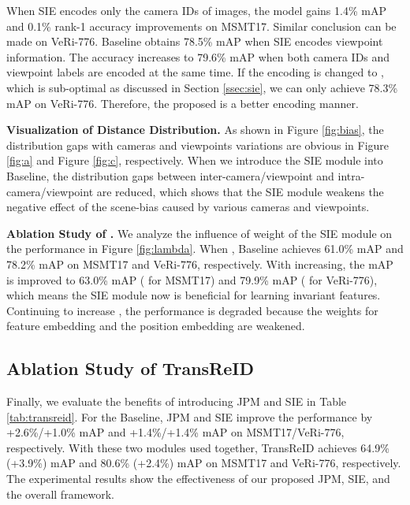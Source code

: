\documentclass[10pt,twocolumn,letterpaper]{article}
\begin{document}
When SIE encodes only the camera IDs of images, the model gains 1.4\% mAP and 0.1\% rank-1 accuracy improvements on MSMT17. Similar conclusion can be made on VeRi-776. Baseline obtains 78.5\% mAP when SIE encodes viewpoint information. The accuracy increases to 79.6\% mAP when both camera IDs and viewpoint labels are encoded at the same time. If the encoding is changed to , which is sub-optimal as discussed in Section \ref{ssec:sie}, we can only achieve 78.3\% mAP on VeRi-776. Therefore, the proposed  is a better encoding manner.


\textbf{Visualization of Distance Distribution.} 
As shown in Figure \ref{fig:bias}, the distribution gaps with cameras and viewpoints variations are obvious in Figure \ref{fig:a} and Figure \ref{fig:c}, respectively. When we introduce the SIE module into Baseline, the distribution gaps between inter-camera/viewpoint and intra-camera/viewpoint are reduced, which shows that the SIE module weakens the negative effect of the scene-bias caused by various cameras and viewpoints.

\textbf{Ablation Study of .} 
We analyze the influence of weight  of the SIE module on the performance in Figure \ref{fig:lambda}. When , Baseline achieves 61.0\% mAP and 78.2\% mAP on MSMT17 and VeRi-776, respectively. With  increasing, the mAP is improved to 63.0\% mAP ( for MSMT17) and 79.9\% mAP ( for VeRi-776), which means the SIE module now is beneficial for learning invariant features. Continuing to increase , the performance is degraded because the weights for feature embedding and the position embedding are weakened.

\subsection{Ablation Study of TransReID}

Finally, we evaluate the benefits of introducing JPM and SIE in Table \ref{tab:transreid}. For the Baseline, JPM and SIE improve the performance by  +2.6\%/+1.0\% mAP and +1.4\%/+1.4\% mAP on MSMT17/VeRi-776, respectively. With these two modules used together, TransReID achieves 64.9\% (+3.9\%) mAP and 80.6\% (+2.4\%) mAP on MSMT17 and VeRi-776, respectively. 
The experimental results show the effectiveness of our proposed JPM, SIE, and the overall framework.
\end{document}
